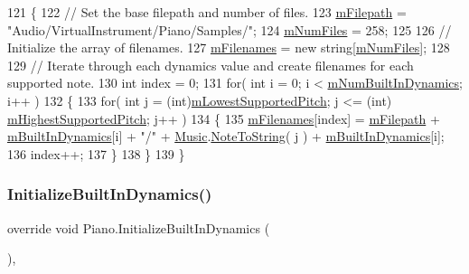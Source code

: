 \begin{DoxyCode}
121     \{
122         \textcolor{comment}{// Set the base filepath and number of files.}
123         \hyperlink{group___v_i_base_pro_var_gac428224be859933d720a9c533fdb5643}{mFilepath} = \textcolor{stringliteral}{"Audio/VirtualInstrument/Piano/Samples/"};
124         \hyperlink{group___v_i_base_pro_var_ga9a602db8c9833ce75d95dd453c27d341}{mNumFiles} = 258;
125 
126         \textcolor{comment}{// Initialize the array of filenames.}
127         \hyperlink{group___v_i_base_pro_var_gab2add474ca506357688b5dd08cac4cb5}{mFilenames} = \textcolor{keyword}{new} \textcolor{keywordtype}{string}[\hyperlink{group___v_i_base_pro_var_ga9a602db8c9833ce75d95dd453c27d341}{mNumFiles}];
128 
129         \textcolor{comment}{// Iterate through each dynamics value and create filenames for each supported note.}
130         \textcolor{keywordtype}{int} index = 0;
131         \textcolor{keywordflow}{for}( \textcolor{keywordtype}{int} i = 0; i < \hyperlink{group___v_i_base_pro_var_gac265f64f759d267ee1e1680f8d387011}{mNumBuiltInDynamics}; i++ )
132         \{
133             \textcolor{keywordflow}{for}( \textcolor{keywordtype}{int} j = (\textcolor{keywordtype}{int})\hyperlink{group___v_i_base_pro_var_ga3cae52b1bcc0178a8a6b03c7aaf7aac8}{mLowestSupportedPitch}; j <= (int)
      \hyperlink{group___v_i_base_pro_var_ga61fb2c33b53a0f663047779d7ceb18f3}{mHighestSupportedPitch}; j++ )
134             \{
135                 \hyperlink{group___v_i_base_pro_var_gab2add474ca506357688b5dd08cac4cb5}{mFilenames}[index] = \hyperlink{group___v_i_base_pro_var_gac428224be859933d720a9c533fdb5643}{mFilepath} + 
      \hyperlink{group___v_i_base_pro_var_ga87961e72f25fbc2256b614a394aa6f13}{mBuiltInDynamics}[i] + \textcolor{stringliteral}{"/"} + \hyperlink{class_music}{Music}.\hyperlink{group___music_stat_func_ga85a22c905d56d4c5f4e62159bfecee8c}{NoteToString}( j ) + 
      \hyperlink{group___v_i_base_pro_var_ga87961e72f25fbc2256b614a394aa6f13}{mBuiltInDynamics}[i];
136                 index++;
137             \}
138         \}
139     \}
\end{DoxyCode}
\mbox{\label{group___piano_virt_func_ga6bc02528f8808b8a30aa7d5776445a6d}} 
\subsubsection{\texorpdfstring{Initialize\+Built\+In\+Dynamics()}{InitializeBuiltInDynamics()}}
{\footnotesize\ttfamily override void Piano.\+Initialize\+Built\+In\+Dynamics (\begin{DoxyParamCaption}{ }\end{DoxyParamCaption})\hspace{0.3cm}{\ttfamily [protected]}, {\ttfamily [virtual]}}



